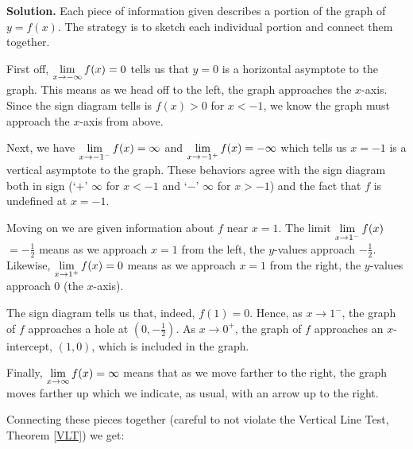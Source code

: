 \documentclass{ximera}
\begin{document}
\begin{ex}
\begin{center}
\end{center}



{\bf Solution.} Each piece of information given describes a portion of the graph of $y = f(x)$.  The strategy is to sketch each individual portion and connect them together.

\medskip

First off, $\ds{\lim_{x \rightarrow -\infty} f(x) = 0}$ tells us that $y = 0$ is a horizontal asymptote to the graph.  This means as we head off to the left, the graph approaches the $x$-axis.  Since the sign diagram tells is $f(x) > 0$ for $x<-1$, we know the graph must approach the $x$-axis from above.

\medskip

Next, we have $\ds{\lim_{x \rightarrow -1^{-}} f(x) = \infty}$ and  $\ds{\lim_{x \rightarrow -1^{+}} f(x) = - \infty}$ which tells us $x=-1$ is a vertical asymptote to the graph.  These behaviors agree with the sign diagram both in sign (`$+$' $\infty$ for $x<-1$ and `$-$' $\infty$ for $x>-1$) and the fact that $f$ is undefined at $x = -1$.

\medskip

Moving on we are given information about $f$ near $x = 1$.    The limit $\ds{\lim_{x \rightarrow 1^{-}} f(x)}$ $= -\frac{1}{2}$  means as we approach $x=1$ from the left, the $y$-values approach $-\frac{1}{2}$.  Likewise, $\ds{\lim_{x \rightarrow 1^{+}} f(x) = 0}$ means as we approach $x=1$ from the right, the $y$-values approach $0$ (the $x$-axis).  

\medskip

The sign diagram tells us that, indeed, $f(1) = 0$.  Hence, as $x \rightarrow 1^{-}$,  the graph of $f$ approaches a hole at $\left(0, -\frac{1}{2}\right)$.  As $x \rightarrow 0^{+}$, the graph of $f$ approaches an $x$-intercept, $(1,0)$, which is included in the graph. 

\medskip

Finally,   $\ds{\lim_{x \rightarrow \infty } f(x) = \infty}$  means that as we move farther to the right, the graph moves farther up which we indicate, as usual, with an arrow up to the right.

\medskip

Connecting these pieces together (careful to not violate the Vertical Line Test, Theorem \ref{VLT}) we get:

\begin{center}



\end{center}
\end{ex}
\end{document}
